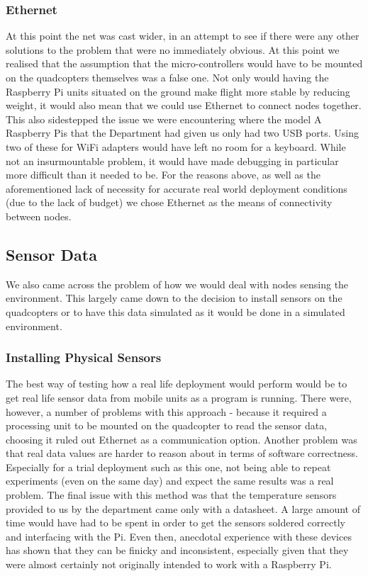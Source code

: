 \subsubsection{Ethernet}
At this point the net was cast wider, in an attempt to see if there were any other solutions to the problem that were no immediately obvious. At this point we realised that the assumption that the micro-controllers would have to be mounted on the quadcopters themselves was a false one. Not only would having the Raspberry Pi units situated on the ground make flight more stable by reducing weight, it would also mean that we could use Ethernet to connect nodes together. This also sidestepped the issue we were encountering where the model A Raspberry Pis that the Department had given us only had two USB ports. Using two of these for WiFi adapters would have left no room for a keyboard. While not an insurmountable problem, it would have made debugging in particular more difficult than it needed to be. For the reasons above, as well as the aforementioned lack of necessity for accurate real world deployment conditions (due to the lack of budget) we chose Ethernet as the means of connectivity between nodes.

\subsection{Sensor Data}
We also came across the problem of how we would deal with nodes sensing the environment. This largely came down to the decision to install sensors on the quadcopters or to have this data simulated as it would be done in a simulated environment. 

\subsubsection{Installing Physical Sensors}
The best way of testing how a real life deployment would perform would be to get real life sensor data from mobile units as a program is running. There were, however, a number of problems with this approach - because it required a processing unit to be mounted on the quadcopter to read the sensor data, choosing it ruled out Ethernet as a communication option. Another problem was that real data values are harder to reason about in terms of software correctness. Especially for a trial deployment such as this one, not being able to repeat experiments (even on the same day) and expect the same results was a real problem. The final issue with this method was that the temperature sensors provided to us by the department came only with a datasheet. A large amount of time would have had to be spent in order to get the sensors soldered correctly and interfacing with the Pi. Even then, anecdotal experience with these devices has shown that they can be finicky and inconsistent, especially given that they were almost certainly not originally intended to work with a Raspberry Pi.

